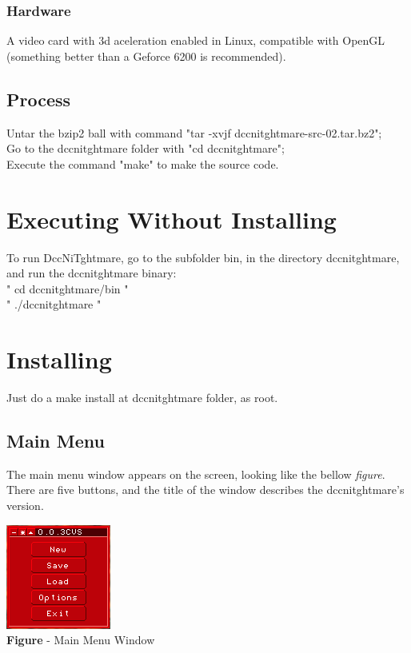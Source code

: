 \documentclass[ letterpaper,12pt]{article}
\begin{document}
\subsubsection{Hardware}
A video card with 3d aceleration enabled in Linux, compatible with OpenGL
(something better than a Geforce 6200 is recommended).

\subsection{Process}

Untar the bzip2 ball with command "tar -xvjf dccnitghtmare-src-02.tar.bz2";\\
Go to the dccnitghtmare folder with "cd dccnitghtmare";\\
Execute the command "make" to make the source code.

\section{Executing Without Installing}

To run DccNiTghtmare, go to the subfolder bin, in the directory dccnitghtmare, and run the dccnitghtmare binary:\\
" cd dccnitghtmare/bin "\\
" ./dccnitghtmare "

\section{Installing}

Just do a make install at dccnitghtmare folder, as root.

\subsection{Main Menu}

The main menu window appears on the screen, looking like the bellow {\it figure}. There are five buttons, and the title of the window describes the dccnitghtmare's version.

\begin{center}
  \includegraphics{mainMenuWindow.png}
\\{\bf Figure} - Main Menu Window
\end{center}
\end{document}
